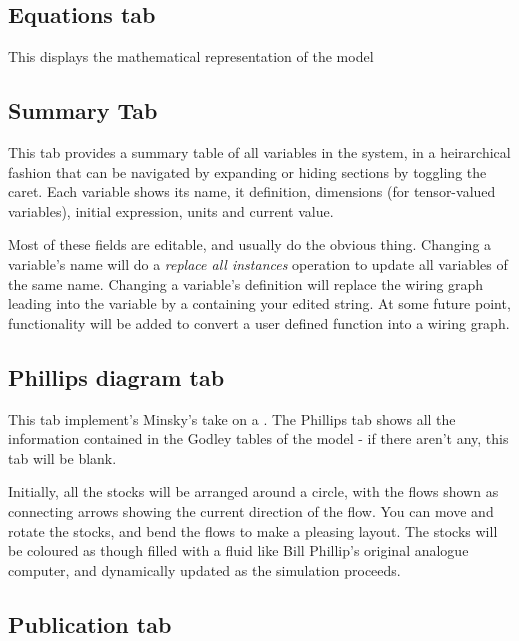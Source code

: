 
\subsection{Equations tab}\label{tabs:Equations}

This displays the mathematical representation of the model

\subsection{Summary Tab}\label{tabs:Summary}

This tab provides a summary table of all variables in the system, in a
heirarchical fashion that can be navigated by expanding or hiding
sections by toggling the caret. Each variable shows its name, it
definition, dimensions (for tensor-valued variables), initial
expression, units and current value.

Most of these fields are editable, and usually do the obvious
thing. Changing a variable's name will do a {\em replace all
  instances} operation to update all variables of the same
name. Changing a variable's definition will replace the wiring graph
leading into the variable by a  containing your
edited string. At some future point, functionality will be added to
convert a user defined function into a wiring graph.

\subsection{Phillips diagram tab}\label{tabs:Phillips}

This tab implement's Minsky's take on a . The
Phillips tab shows all the information contained in the Godley tables
of the model - if there aren't any, this tab will be blank.

Initially, all the stocks will be arranged around a circle, with the
flows shown as connecting arrows showing the current direction of the
flow. You can move and rotate the stocks, and bend the flows to make a
pleasing layout. The stocks will be coloured as though filled with a
fluid like Bill Phillip's original analogue computer, and dynamically
updated as the simulation proceeds.

\subsection{Publication tab}\label{tabs:Publication}

